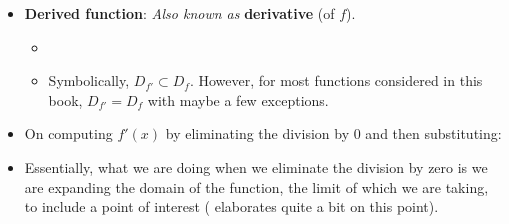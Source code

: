 \documentclass[../main.tex]{subfiles}
\begin{document}
\begin{itemize}
\begin{enumerate}
    \end{enumerate}
    \item \textbf{Derived function}:  \emph{Also known as} \textbf{derivative} (of $f$).
    \begin{itemize}
        \item {}
        \item Symbolically, $D_{f'}\subset D_f$. However, for most functions considered in this book, $D_{f'}=D_f$ with maybe a few exceptions.
    \end{itemize}
    \item On computing $f'(x)$ by eliminating the division by 0 and then substituting: 
    \item Essentially, what we are doing when we eliminate the division by zero is we are expanding the domain of the function, the limit of which we are taking, to include a point of interest (\cite{bib:Thomas} elaborates quite a bit on this point).
\end{itemize}
\end{document}
